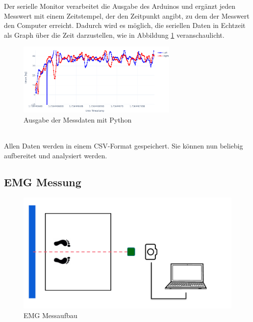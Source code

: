 Der serielle Monitor verarbeitet die Ausgabe des Arduinos und ergänzt jeden Messwert mit einem Zeitstempel, der den Zeitpunkt angibt, zu dem der Messwert den Computer erreicht. Dadurch wird es möglich, die seriellen Daten in Echtzeit als Graph über die Zeit darzustellen, wie in Abbildung \ref{fig:serial_output} veranschaulicht.
\begin{figure}[h!]
    \centering
    \includegraphics[width=0.7\textwidth]{img/serial_output_example.png} %
    \caption{Ausgabe der Messdaten mit Python}
    \label{fig:serial_output}
\end{figure}
\\
Allen Daten werden in einem CSV-Format gespeichert.
Sie können nun beliebig aufbereitet und analysiert werden.


\subsection{EMG Messung}

\begin{figure}
    \centering
    \includegraphics[width=0.8\linewidth]{img/Aufbau EMG.png}
    \caption{EMG Messaufbau }
    \label{EMG Messaufbau}
\end{figure}


